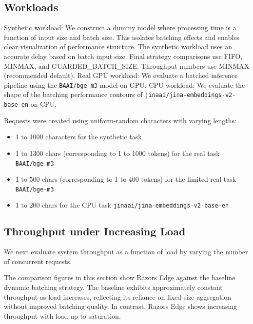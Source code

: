 \documentclass{article}
\providecommand{\tightlist}{\setlength{\itemsep}{0pt}\setlength{\parskip}{0pt}}
\begin{document}
\hypertarget{74-workloads}{%
\subsection{Workloads}\label{74-workloads}}

Synthetic workload: We construct a dummy model where processing time is
a function of input size and batch size. This isolates batching effects
and enables clear visualization of performance structure. The synthetic
workload uses an accurate delay based on batch input size. Final
strategy comparisons use FIFO, MINMAX, and GUARDED\_BATCH\_SIZE.
Throughput numbers use MINMAX (recommended default). Real GPU workload:
We evaluate a batched inference pipeline using the \texttt{BAAI/bge-m3}
model on GPU. CPU workload: We evaluate the shape of the batching
performance contours of \texttt{jinaai/jina-embeddings-v2-base-en} on
CPU.

Requests were created using uniform-random characters with varying
lengths:

\begin{itemize}
\tightlist
\item
  1 to 1000 characters for the synthetic task
\item
  1 to 1300 chars (corresponding to 1 to 1000 tokens) for the real task
  \texttt{BAAI/bge-m3}
\item
  1 to 500 chars (corresponding to 1 to 400 tokens) for the limited real
  task \texttt{BAAI/bge-m3}
\item
  1 to 200 chars for the CPU task
  \texttt{jinaai/jina-embeddings-v2-base-en}
\end{itemize}

\hypertarget{75-throughput-under-increasing-load}{%
\subsection{Throughput under Increasing
Load}\label{75-throughput-under-increasing-load}}

We next evaluate system throughput as a function of load by varying the
number of concurrent requests.

The comparison figures in this section show Razor\textquotesingle s Edge
against the baseline dynamic batching strategy. The baseline exhibits
approximately constant throughput as load increases, reflecting its
reliance on fixed-size aggregation without improved batching quality. In
contrast, Razor\textquotesingle s Edge shows increasing throughput with
load up to saturation.
\end{document}
